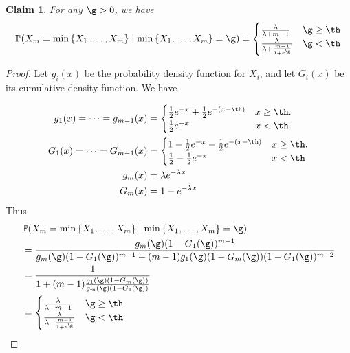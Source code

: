 \documentclass[12pt]{article}
\newcommand{\1}{\textbf{1}}
\newtheorem{claim}{Claim}
\newcommand{\set}[1]{\left\{#1\right\}}
\def\Pr{\mathbb{P}}
\newcommand{\beq}[2]{\begin{equation}\label{#1}#2\end{equation}}
\begin{document}
\begin{claim}
 For any $\g>0$, we have
 \beq{eq:conditional}
 {
 \Pr(X_m=\min\set{X_1,\ldots,X_m}\mid \min\set{X_1,\ldots,X_m}=\g)= \begin{cases}
\frac{\lambda}{\lambda + m-1} & \g \ge \th\\
    \frac{\lambda}{\lambda + \frac{m-1}{1+e^\g}}& \g < \th
\end{cases}
 }
\end{claim}
\begin{proof}
Let $g_i(x)$ be the probability density function for $X_i$, and let $G_i(x)$ be its cumulative density function. We have

\begin{align*}
g_1(x) = \cdots = g_{m-1}(x)&=\begin{cases}\frac12e^{-x}+\frac12e^{-(x-\th)}&x\geq \th.\\ \frac12e^{-x}&x<\th.\end{cases}\\
G_1(x) = \cdots = G_{m-1}(x)&=\begin{cases}1-\frac12e^{-x}-\frac12e^{-(x-\th)}&x\geq \th.\\ \frac12 - \frac12e^{-x}&x<\th\end{cases}\\
g_m(x) &= \lambda e^{-\lambda x}\\
G_m(x) &= 1- e^{-\lambda x}
\end{align*}
 Thus 
 \begin{align*}
&\Pr(X_m=\min\set{X_1,\ldots,X_m}\mid \min\set{X_1,\ldots,X_m}=\g)\\
&=\frac{g_m(\g)(1-G_1(\g))^{m-1}}{g_m(\g)(1-G_1(\g))^{m-1}+(m-1)g_1(\g) (1-G_m(\g))(1-G_1(\g))^{m-2}}\\
&=\frac{1}{1+(m-1)\frac{g_1(\g)(1-G_m(\g))}{g_m(\g)(1-G_1(\g))}}\\
& =  \begin{cases}
\frac{\lambda}{\lambda + m-1} & \g \ge \th\\
    \frac{\lambda}{\lambda + \frac{m-1}{1+e^\g}}& \g < \th
\end{cases}
\end{align*}



\end{proof}
\end{document}
